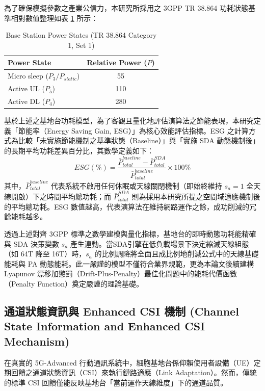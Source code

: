 為了確保模擬參數之產業公信力，本研究所採用之 3GPP TR 38.864 功耗狀態基準相對數值整理如表 \ref{tab:power_states} 所示：

\begin{table}[htbp]
\centering
\caption{Base Station Power States (TR 38.864 Category 1, Set 1)}
\label{tab:power_states}
\renewcommand{\arraystretch}{1.2}
\begin{tabular}{|l|c|}
\hline
\textbf{Power State} & \textbf{Relative Power ($P$)} \\ \hline
Micro sleep ($P_3 / P_{static}$) & 55 \\ \hline
Active UL ($P_5$) & 110 \\ \hline
Active DL ($P_4$) & 280 \\ \hline
\end{tabular}
\end{table}

基於上述之基地台功耗模型，為了客觀且量化地評估演算法之節能表現，本研究定義「節能率（Energy Saving Gain, ESG）」為核心效能評估指標。ESG 之計算方式為比較「未實施節能機制之基準狀態（Baseline）」與「實施 SDA 動態機制後」的長期平均功耗差異百分比，其數學定義如下：
\begin{equation}
\label{eq:esg}
ESG (\%) = \frac{\bar{P}_{total}^{baseline} - \bar{P}_{total}^{SDA}}{\bar{P}_{total}^{baseline}} \times 100\%
\end{equation}
其中，$\bar{P}_{total}^{baseline}$ 代表系統不啟用任何休眠或天線關閉機制（即始終維持 $s_a = 1$ 全天線開啟）下之時間平均總功耗；而 $\bar{P}_{total}^{SDA}$ 則為採用本研究所提之空間域適應機制後的平均總功耗。ESG 數值越高，代表演算法在維持網路運作之餘，成功削減的冗餘能耗越多。

透過上述對齊 3GPP 標準之數學建模與量化指標，基地台的即時動態功耗能精確與 SDA 決策變數 $s_a$ 產生連動。當SDA引擎在低負載場景下決定縮減天線組態（如 64T 降至 16T）時，$s_a$ 的比例調降將全面且成比例地削減公式中的天線基礎能耗與 PA 動態能耗。此一嚴謹的模型不僅符合業界規範，更為本論文後續建構 Lyapunov 漂移加懲罰（Drift-Plus-Penalty）最佳化問題中的能耗代價函數（Penalty Function）奠定嚴謹的理論基礎。
\subsection{通道狀態資訊與 Enhanced CSI 機制 (Channel State Information and Enhanced CSI Mechanism)}

在真實的 5G-Advanced 行動通訊系統中，細胞基地台係仰賴使用者設備（UE）定期回饋之通道狀態資訊（CSI）來執行鏈路適應（Link Adaptation）。然而，傳統的標準 CSI 回饋僅能反映基地台「當前運作天線維度」下的通道品質。

